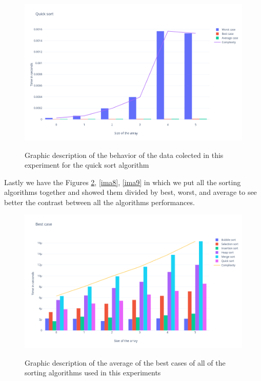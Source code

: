 \documentclass{article}
\begin{document}
 
\begin{figure}[htp]
	\centering
		\caption{Graphic description of the behavior of the data colected in this experiment for the quick sort algorithm}
	\includegraphics[width=\linewidth]{Quicksort.png}
	\label{ima6}
\end{figure}

Lastly we have the Figures \ref{ima7}, \ref{ima8}, \ref{ima9} in which we put all the sorting algorithms together and showed them divided by best, worst, and average to see better the contrast between all the algorithms performances.\\
\begin{figure}[htp]
	\centering
		\caption{Graphic description of the average of the best cases of all of the sorting algorithms used in this experiments}
	\includegraphics[width=\linewidth]{Bestcase.png}
	\label{ima7}
\end{figure}
\end{document}
